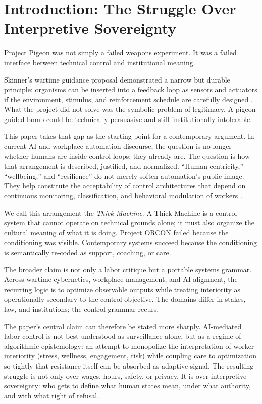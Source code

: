 \documentclass[runningheads]{llncs}
\begin{document}
\section{Introduction: The Struggle Over Interpretive Sovereignty}

Project Pigeon was not simply a failed weapons experiment. It was a failed interface between technical control and institutional meaning.

Skinner's wartime guidance proposal demonstrated a narrow but durable principle: organisms can be inserted into a feedback loop as sensors and actuators if the environment, stimulus, and reinforcement schedule are carefully designed \cite{skinner1960pigeons,capshew1993engineering}. What the project did not solve was the symbolic problem of legitimacy. A pigeon-guided bomb could be technically persuasive and still institutionally intolerable.

This paper takes that gap as the starting point for a contemporary argument. In current AI and workplace automation discourse, the question is no longer whether humans are inside control loops; they already are. The question is how that arrangement is described, justified, and normalized. ``Human-centricity,'' ``wellbeing,'' and ``resilience'' do not merely soften automation's public image. They help constitute the acceptability of control architectures that depend on continuous monitoring, classification, and behavioral modulation of workers \cite{breque2021industry,kellogg2020algorithms}.

We call this arrangement the \emph{Thick Machine}. A Thick Machine is a control system that cannot operate on technical grounds alone; it must also organize the cultural meaning of what it is doing. Project ORCON failed because the conditioning was visible. Contemporary systems succeed because the conditioning is semantically re-coded as support, coaching, or care.

The broader claim is not only a labor critique but a portable systems grammar. Across wartime cybernetics, workplace management, and AI alignment, the recurring logic is to optimize observable outputs while treating interiority as operationally secondary to the control objective. The domains differ in stakes, law, and institutions; the control grammar recurs.

The paper's central claim can therefore be stated more sharply. AI-mediated labor control is not best understood as surveillance alone, but as a regime of algorithmic epistemology: an attempt to monopolize the interpretation of worker interiority (stress, wellness, engagement, risk) while coupling care to optimization so tightly that resistance itself can be absorbed as adaptive signal. The resulting struggle is not only over wages, hours, safety, or privacy. It is over interpretive sovereignty: who gets to define what human states mean, under what authority, and with what right of refusal.
\end{document}
